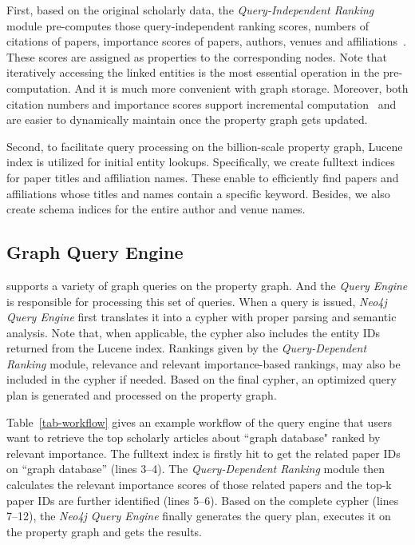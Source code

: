First, based on the original scholarly data, the {\em Query-Independent Ranking} module pre-computes those query-independent ranking scores, \ie numbers of citations of papers, importance scores of papers, authors, venues and affiliations~\cite{ma2018query}. These scores are assigned as properties to the corresponding nodes.
Note that iteratively accessing the linked entities is the most essential operation in the pre-computation. And it is much more convenient with graph storage.
Moreover, both citation numbers and importance scores support incremental computation~\cite{ma2018query} and are easier to dynamically maintain once the property graph gets updated.


Second, to facilitate query processing on the billion-scale property graph, Lucene index is utilized for initial entity lookups. Specifically, we create fulltext indices for paper titles and affiliation names. These enable to efficiently find papers and affiliations whose titles and names contain a specific keyword. Besides, we also create schema indices for the entire author and venue names. %



\subsection{Graph Query Engine} \label{subsec:qe}
\oursystem supports a variety of graph queries on the property graph. And the {\em Query Engine} is responsible for processing this set of queries. When a query is issued, {\em Neo4j Query Engine} first translates it into a cypher with proper parsing and semantic analysis.
Note that, when applicable, the cypher also includes the entity IDs returned from the Lucene index. Rankings given by the {\em Query-Dependent Ranking} module, \ie relevance and relevant importance-based rankings, may also be included in the cypher if needed. Based on the final cypher, an optimized query plan is generated and processed on the property graph.


Table~\ref{tab-workflow} gives an example workflow of the query engine that users want to retrieve the top scholarly articles about ``graph database"  ranked by relevant importance. The fulltext index is firstly hit to get the related paper IDs on ``graph database'' (lines 3--4). The {\em Query-Dependent Ranking} module then calculates the relevant importance scores of those related papers and the top-k paper IDs are further identified (lines 5--6). Based on the complete cypher (lines 7--12), the {\em Neo4j Query Engine} finally generates the query plan, executes it on the property graph and gets the results.


